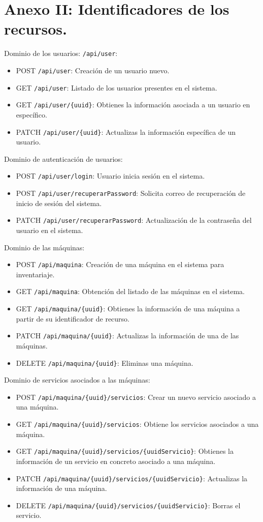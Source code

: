 
\section{Anexo II: Identificadores de los recursos.}
Dominio de los usuarios:
\texttt{/api/user}:
\begin{itemize}
  \item POST \texttt{/api/user}: Creación de un usuario nuevo.
  \item GET \texttt{/api/user}: Listado de los usuarios presentes en el sistema.
  \item GET \texttt{/api/user/\{uuid\}}: Obtienes la información asociada a un usuario en específico.
  \item PATCH \texttt{/api/user/\{uuid\}}: Actualizas la información específica de un usuario.
\end{itemize}

Dominio de autenticación de usuarios:
\begin{itemize}
  \item POST \texttt{/api/user/login}: Usuario inicia sesión en el sistema.
  \item POST \texttt{/api/user/recuperarPassword}: Solicita correo de recuperación de inicio de sesión del sistema.
  \item PATCH \texttt{/api/user/recuperarPassword}: Actualización de la contraseña del usuario en el sistema. 
\end{itemize}

Dominio de las máquinas:
\begin{itemize}
  \item POST \texttt{/api/maquina}: Creación de una máquina en el sistema para inventariaje.
  \item GET \texttt{/api/maquina}: Obtención del listado de las máquinas en el sistema.
  \item GET \texttt{/api/maquina/\{uuid\}}: Obtienes la información de una máquina a partir de su identificador de recurso.
  \item PATCH \texttt{/api/maquina/\{uuid\}}: Actualizas la información de una de las máquinas. 
  \item DELETE \texttt{/api/maquina/\{uuid\}}: Eliminas una máquina.
\end{itemize}

Dominio de servicios asociados a las máquinas: 

\begin{itemize}
  \item POST \texttt{/api/maquina/\{uuid\}/servicios}: Crear un nuevo servicio asociado a una máquina.
  \item GET \texttt{/api/maquina/\{uuid\}/servicios}: Obtiene los servicios asociados a una máquina.
  \item GET \texttt{/api/maquina/\{uuid\}/servicios/\{uuidServicio\}}: Obtienes la información de un servicio en concreto asociado a una máquina.
  \item PATCH \texttt{/api/maquina/\{uuid\}/servicios/\{uuidServicio\}}: Actualizas la información de una máquina. 
  \item DELETE \texttt{/api/maquina/\{uuid\}/servicios/\{uuidServicio\}}: Borras el servicio.
\end{itemize}

